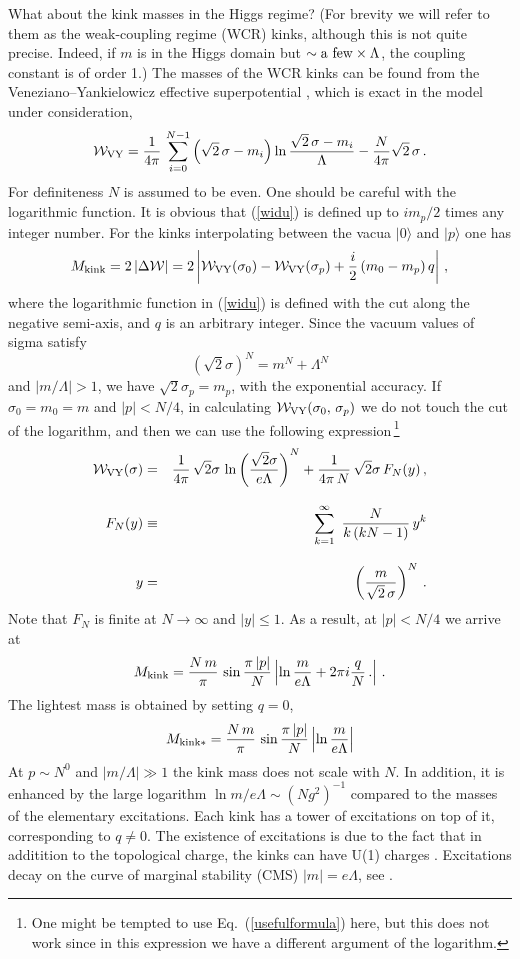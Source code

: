 \documentclass[epsfig,12pt]{article}
\def\beq{\begin{equation}}
\def\eeq{\end{equation}}
\def\beqn{\begin{eqnarray}}
\def\eeqn{\end{eqnarray}}
\newcommand{\cw}{{\mathcal W}}
\begin{document}
What about the kink masses in the Higgs regime? (For brevity we will refer to them as
the weak-coupling regime (WCR) kinks, although this is not quite precise.
Indeed, if $m$ is in the Higgs domain but $\sim {\rm a\,\, few}\times\Lambda$, the coupling constant is 
of order 1.) The masses of the WCR
kinks
can be found from the Veneziano--Yankielowicz
effective superpotential \cite{HaHo},
which is exact in the model under consideration,
\beq
\cw_{\rm VY} 
=
 \frac{1}{4\pi}
\,\sum_{i=0}^{N-1}\left(\sqrt{2}\,\sigma -m_i
\right)\ln\frac{\sqrt{2}\,\sigma -m_i}{\Lambda}-\frac{N}{4\pi}\sqrt{2}\,\sigma\,.
\label{widu}
\eeq
For definiteness $N$ is assumed to be even.
One should be careful with the logarithmic function. It is obvious that (\ref{widu})
is defined up to $im_p/2$ times any integer number.
For the kinks interpolating between the  vacua $|0\rangle$ and  $|p\rangle$  one has \cite{HaHo}
\beq
M_{\rm kink} 
=
 2\left|\Delta \cw\right|= 2\left|\cw_{\rm VY} (\sigma_0) - \cw_{\rm VY} (\sigma_p)+\frac{i}{2}\left(m_0-m_p\right) q  \right|\,,
   \label{widup}
\eeq
where the logarithmic function in (\ref{widu}) is defined with the cut along the negative semi-axis, and $q$ is an arbitrary integer.
Since the vacuum values of sigma satisfy
$$(\sqrt{2}\sigma)^N = m^N + \Lambda^N$$ and $|m/\Lambda| >1$, we 
have $\sqrt{2}\sigma_p = m_p$, with the exponential accuracy.
If  $\sigma_0=m_0=m$ and $|p|<N/4$, in calculating  $\cw_{\rm VY} (\sigma_0, \,\sigma_p)$
we do not touch the cut of the logarithm, and then we can use the following expression\,\footnote{One might be tempted to use Eq.~(\ref{usefulformula}) here, but this does not work
since in this expression we have a different argument of the logarithm.}
\beqn
\cw_{\rm VY}(\sigma)
&=&
  \frac{1}{4\pi}\,\sqrt{2}\sigma\,   \ln\left(\frac{\sqrt{2}\sigma}{e\Lambda}\right)^N
+\frac{1}{4\pi\,N }\,\sqrt{2}\sigma\,F_N(y)\,,
\nonumber\\[3mm]
F_N(y) 
&\equiv&
 \sum_{k=1}^\infty \,\,\frac{N}{k\, (kN-1)}\, y^k
\nonumber\\[3mm]
 y 
&=& 
\left(\frac{m}{\sqrt{2}\,\sigma}\right)^N\,.
\label{chet1}
\eeqn
Note that $F_N$ is finite at $N\to \infty$ and $|y|\leq 1$. 
As a result, at  $|p|<N/4$ we arrive at
\beq
M_{\rm kink} 
=
\frac{N\,m}{\pi}\,\sin\frac{\pi\, |p|}{N}\left|\ln\frac{m}{e\Lambda} +2\pi i\frac{q}{N}\,.
\right|\,.
\label{chet4}
\eeq
The lightest mass is obtained by setting $q=0$,
\beq
M_{{\rm kink}*} 
=
\frac{N\,m}{\pi}\,\sin\frac{\pi\, |p|}{N}\left|\ln\frac{m}{e\Lambda} 
\right|
\label{chet4w}
\eeq
At $p\sim N^0$ and
$|m/\Lambda |\gg1$ the kink mass does not scale with $N$. In addition,  it is enhanced by 
the large logarithm $\ln m/e\Lambda\sim (Ng^2)^{-1}$ compared to the masses of the elementary excitations.
Each kink has a tower of excitations on top of it, corresponding to $q\neq 0$.
The existence of excitations is due to the fact that
in additition to  the topological charge, the kinks can  have U(1) charges \cite{Dor}. 
Excitations decay on the curve of marginal stability (CMS) $|m| =e\Lambda$, see \cite{Olmez}.
\end{document}
